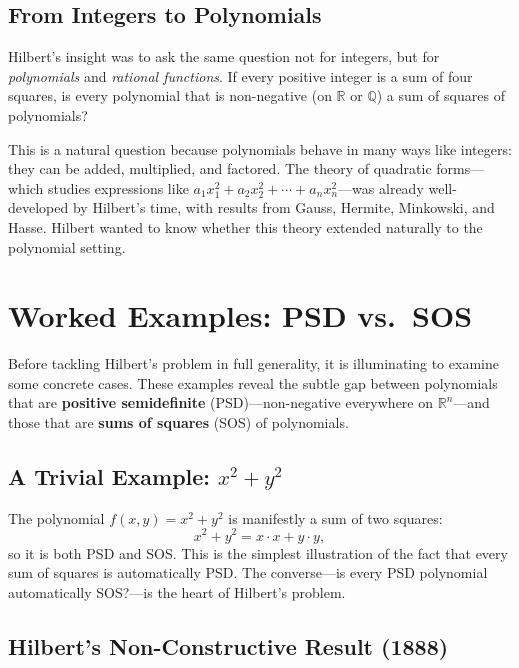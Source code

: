 \subsection{From Integers to Polynomials}

Hilbert's insight was to ask the same question not for integers, but for \emph{polynomials} and \emph{rational functions}. If every positive integer is a sum of four squares, is every polynomial that is non-negative (on $\mathbb{R}$ or $\mathbb{Q}$) a sum of squares of polynomials?

This is a natural question because polynomials behave in many ways like integers: they can be added, multiplied, and factored. The theory of quadratic forms---which studies expressions like $a_1 x_1^2 + a_2 x_2^2 + \cdots + a_n x_n^2$---was already well-developed by Hilbert's time, with results from Gauss, Hermite, Minkowski, and Hasse. Hilbert wanted to know whether this theory extended naturally to the polynomial setting.

\section{Worked Examples: PSD vs.\ SOS}

Before tackling Hilbert's problem in full generality, it is illuminating to examine some concrete cases. These examples reveal the subtle gap between polynomials that are \textbf{positive semidefinite} (PSD)---non-negative everywhere on $\mathbb{R}^n$---and those that are \textbf{sums of squares} (SOS) of polynomials.

\subsection{A Trivial Example: \texorpdfstring{$x^2 + y^2$}{x2+y2}}

The polynomial $f(x,y) = x^2 + y^2$ is manifestly a sum of two squares:
\[
    x^2 + y^2 = x \cdot x + y \cdot y,
\]
so it is both PSD and SOS. This is the simplest illustration of the fact that every sum of squares is automatically PSD. The converse---is every PSD polynomial automatically SOS?---is the heart of Hilbert's problem.

\subsection{Hilbert's Non-Constructive Result (1888)}


